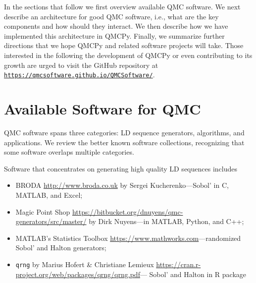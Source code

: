 \documentclass[graybox,footinfo]{svmult}
\begin{document}
In the sections that follow we first overview available QMC software.  We next describe an architecture for good QMC software, i.e., what are the key components and how should they interact.  We then describe how we have implemented this architecture in QMCPy.  Finally, we summarize further directions that we hope QMCPy and related software projects will take.  Those interested in the following the development of QMCPy or even contributing to its growth are urged to visit the GitHub repository at \href{https://qmcsoftware.github.io/QMCSoftware/}{\nolinkurl{https://qmcsoftware.github.io/QMCSoftware/}}.

\section{Available Software for QMC}
QMC software spans three categories:  LD sequence generators, algorithms, and applications.  We review the better known software collections, recognizing that some software overlaps multiple categories.

Software that concentrates on generating high quality LD sequences includes
\begin{itemize}
	\item BRODA \url{http://www.broda.co.uk} by Sergei Kucherenko---Sobol' in C, MATLAB, and Excel; 
	\item Magic Point Shop \url{https://bitbucket.org/dnuyens/qmc-generators/src/master/} by Dirk Nuyens---in MATLAB, Python, and C++;
	\item MATLAB's Statistics Toolbox \url{https://www.mathworks.com}---randomized Sobol' and Halton generators;
	\item \texttt{qrng} by 	Marius Hofert \& Christiane Lemieux \url{https://cran.r-project.org/web/packages/qrng/qrng.pdf}--- Sobol' and Halton  in R package
	
	
\end{itemize}
\end{document}
